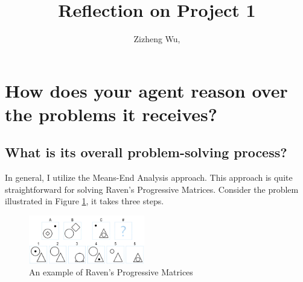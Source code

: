 \documentclass[ letterpaper,
                            paper=letter,
                            DIV=calc,%
                            fontsize=11pt,%
                            pagesize=auto,
                            twocolumn]{scrartcl}                        %
\title{Reflection on Project 1}                   %
\author{Zizheng Wu, }                                           %
\date{}                                                                             %
\newcommand{\initial}[1]{%
     \lettrine[lines=3,lhang=0.3,nindent=0em]{
                    \color{DarkGoldenrod}
                    {\textsf{#1}}}{}}
\begin{document}
\maketitle
\thispagestyle{plain}

\section{How does your agent reason over the problems it receives?}
\subsection{What is its overall problem-solving process?} \label{overall_problem_solving_process}
In general, I utilize the Means-End Analysis approach. This approach is quite straightforward for solving Raven’s Progressive Matrices. Consider the problem illustrated in Figure \ref{problem_overview}, it takes three steps.
\begin{figure}[h]
	\begin{center}
		\includegraphics[width=0.45\textwidth]{images/problem_overview}
		\caption{An example of Raven’s Progressive Matrices}
		\label{problem_overview}
	\end{center}
\end{figure}
\end{document}
